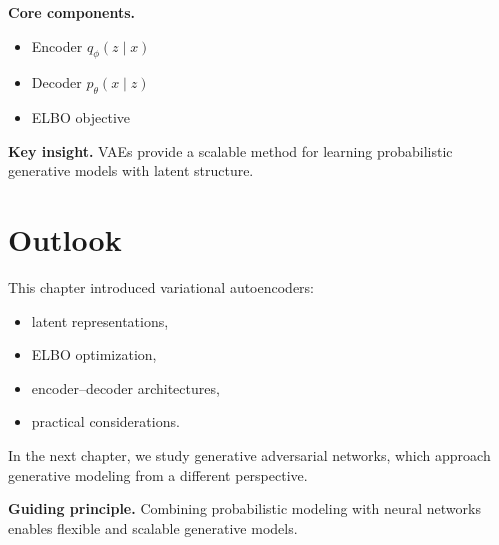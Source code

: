 \medskip

\noindent
\textbf{Core components.}
\begin{itemize}
    \item Encoder $q_\phi(z \mid x)$
    \item Decoder $p_\theta(x \mid z)$
    \item ELBO objective
\end{itemize}

\medskip

\noindent
\textbf{Key insight.}  
VAEs provide a scalable method for learning probabilistic generative models with latent structure.

\section{Outlook}

This chapter introduced variational autoencoders:
\begin{itemize}
    \item latent representations,
    \item ELBO optimization,
    \item encoder--decoder architectures,
    \item practical considerations.
\end{itemize}

\medskip

In the next chapter, we study generative adversarial networks, which approach generative modeling from a different perspective.

\medskip

\noindent
\textbf{Guiding principle.}  
Combining probabilistic modeling with neural networks enables flexible and scalable generative models.